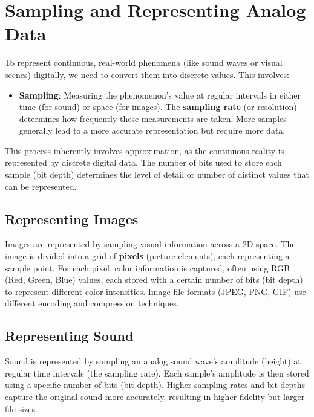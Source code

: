 \documentclass[11pt,oneside]{book}
\begin{document}
\section{Sampling and Representing Analog Data}
\label{sec:sampling}
To represent continuous, real-world phenomena (like sound waves or visual scenes) digitally, we need to convert them into discrete values. This involves:
\begin{itemize}
    \item \textbf{Sampling}: Measuring the phenomenon's value at regular intervals in either time (for sound) or space (for images). The \textbf{sampling rate} (or resolution) determines how frequently these measurements are taken. More samples generally lead to a more accurate representation but require more data.
\end{itemize}
This process inherently involves approximation, as the continuous reality is represented by discrete digital data. The number of bits used to store each sample (bit depth) determines the level of detail or number of distinct values that can be represented.

\subsection*{Representing Images}
Images are represented by sampling visual information across a 2D space. The image is divided into a grid of \textbf{pixels} (picture elements), each representing a sample point. For each pixel, color information is captured, often using RGB (Red, Green, Blue) values, each stored with a certain number of bits (bit depth) to represent different color intensities. Image file formats (JPEG, PNG, GIF) use different encoding and compression techniques.

\subsection*{Representing Sound}
Sound is represented by sampling an analog sound wave's amplitude (height) at regular time intervals (the sampling rate). Each sample's amplitude is then stored using a specific number of bits (bit depth). Higher sampling rates and bit depths capture the original sound more accurately, resulting in higher fidelity but larger file sizes.
\end{document}
